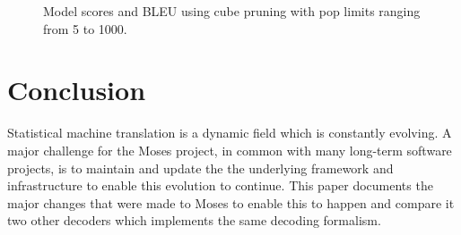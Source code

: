 \documentclass{pbml}
\begin{document}
\begin{figure}

\caption{\label{fig:model}Model scores and BLEU using cube pruning with pop limits ranging from 5 to 1000.}
\end{figure} 

% 
%  
% 
% 
%  
 
\section{Conclusion}

Statistical machine translation is a dynamic field which is constantly evolving. A major challenge for the Moses project, in common with many long-term software projects, is to maintain and update the the underlying framework and infrastructure to enable this evolution to continue. This paper documents the major changes that were made to Moses to enable this to happen and compare it two other decoders which implements the same decoding formalism.
\end{document}
